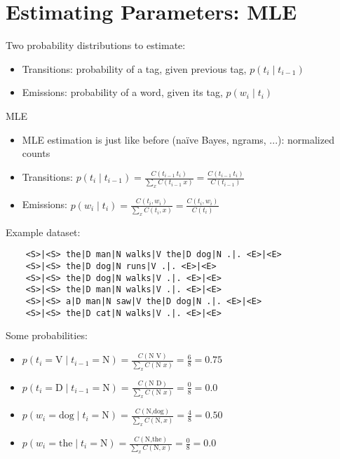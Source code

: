 \documentclass[11pt,letterpaper]{article}
\begin{document}
\section{Estimating Parameters: MLE}

Two probability distributions to estimate:

\begin{itemize}
  \item Transitions: probability of a tag, given previous tag, $p(t_i \mid t_{i-1})$
  \item Emissions: probability of a word, given its tag, $p(w_i \mid t_i)$
\end{itemize}

MLE

\begin{itemize}
  \item MLE estimation is just like before (na\"{i}ve Bayes, ngrams, ...): normalized counts
  \item Transitions: $p(t_i \mid t_{i-1}) = \frac{C(t_{i-1}~t_i)}{\sum_x C(t_{i-1}~x)} = \frac{C(t_{i-1}~t_i)}{C(t_{i-1})}$
  \item Emissions: $p(w_i \mid t_i) = \frac{C(t_i,w_i)}{\sum_x C(t_i,x)} = \frac{C(t_i,w_i)}{C(t_i)}$
\end{itemize}

Example dataset:
\vspace{-2mm}
\begin{verbatim}
    <S>|<S> the|D man|N walks|V the|D dog|N .|. <E>|<E> 
    <S>|<S> the|D dog|N runs|V .|. <E>|<E> 
    <S>|<S> the|D dog|N walks|V .|. <E>|<E> 
    <S>|<S> the|D man|N walks|V .|. <E>|<E> 
    <S>|<S> a|D man|N saw|V the|D dog|N .|. <E>|<E> 
    <S>|<S> the|D cat|N walks|V .|. <E>|<E> 
\end{verbatim}

Some probabilities:

\begin{itemize}
  \item $p(t_i=\text{V} \mid t_{i-1}=\text{N}) = \frac{C(\text{N V})}{\sum_x C(\text{N } x)} = \frac{6}{8} = 0.75$
  \item $p(t_i=\text{D} \mid t_{i-1}=\text{N}) = \frac{C(\text{N D})}{\sum_x C(\text{N } x)} = \frac{0}{8} = 0.0$
  \\
  \item $p(w_i=\text{dog} \mid t_i=\text{N}) = \frac{C(\text{N,dog})}{\sum_x C(\text{N},x)} = \frac{4}{8} = 0.50$
  \item $p(w_i=\text{the} \mid t_i=\text{N}) = \frac{C(\text{N,the})}{\sum_x C(\text{N},x)} = \frac{0}{8} = 0.0$
\end{itemize}
\end{document}
